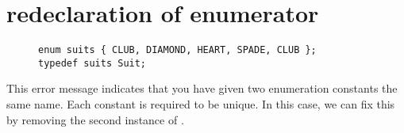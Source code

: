 \section{redeclaration of enumerator}\label{sec:redeclare-enum}

\begin{figure}[htb]
\begin{lstlisting}
enum suits { CLUB, DIAMOND, HEART, SPADE, CLUB };
typedef suits Suit;
\end{lstlisting}
\label{ex:redeclare-enum}
\end{figure}

This error message indicates that you have given two enumeration constants the same name.
Each constant is required to be unique.
In this case, we can fix this by removing the second instance of .
\newpage